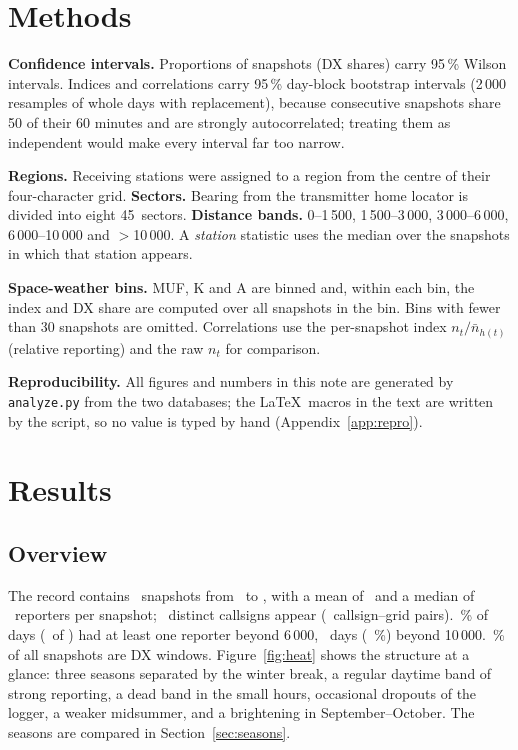 \documentclass[10pt,a4paper]{article}
\begin{document}
\section{Methods}
\textbf{Confidence intervals.} Proportions of snapshots (DX shares) carry 95\,\% Wilson intervals. Indices and correlations carry 95\,\% day-block bootstrap intervals (2\,000 resamples of whole days with replacement), because consecutive snapshots share 50 of their 60 minutes and are strongly autocorrelated; treating them as independent would make every interval far too narrow.

\textbf{Regions.} Receiving stations were assigned to a region from the centre of their four-character grid. \textbf{Sectors.} Bearing from the transmitter home locator is divided into eight 45\textdegree\ sectors. \textbf{Distance bands.} 0--1\,500, 1\,500--3\,000, 3\,000--6\,000, 6\,000--10\,000 and $>$10\,000\km. A \emph{station} statistic uses the median over the snapshots in which that station appears.

\textbf{Space-weather bins.} MUF, K and A are binned and, within each bin, the index and DX share are computed over all snapshots in the bin. Bins with fewer than 30 snapshots are omitted. Correlations use the per-snapshot index $n_t/\bar n_{h(t)}$ (relative reporting) and the raw $n_t$ for comparison.

\textbf{Reproducibility.} All figures and numbers in this note are generated by \texttt{analyze.py} from the two databases; the \LaTeX\ macros in the text are written by the script, so no value is typed by hand (Appendix~\ref{app:repro}).

\section{Results}
\subsection{Overview}
The record contains \nSnap\ snapshots from \dateFrom\ to \dateTo, with a mean of \meanRep\ and a median of \medRep\ reporters per snapshot; \nStations\ distinct callsigns appear (\nPairs\ callsign--grid pairs). \pctDaysDXsix\,\% of days (\daysDXsix\ of \nDays) had at least one reporter beyond 6\,000\km, \daysDXten\ days ( \pctDaysDXten\,\%) beyond 10\,000\km. \shareDXsix\,\% of all snapshots are DX windows. Figure~\ref{fig:heat} shows the structure at a glance: three seasons separated by the winter break, a regular daytime band of strong reporting, a dead band in the small hours, occasional dropouts of the logger, a weaker midsummer, and a brightening in September--October. The seasons are compared in Section~\ref{sec:seasons}.
\end{document}
